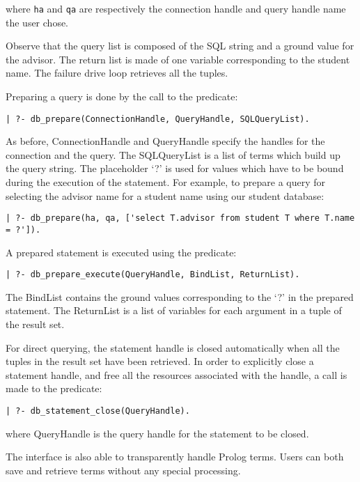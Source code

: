\noindent
where {\tt ha} and {\tt qa} are respectively the connection handle and query
handle name the user chose.

Observe that the query list is composed of the SQL string and a ground value
for the advisor. The return list is made of one variable corresponding to
the student name. The failure drive loop retrieves all the tuples.

Preparing a  query is done by the call to the predicate:

\begin{verbatim}
| ?- db_prepare(ConnectionHandle, QueryHandle, SQLQueryList).
\end{verbatim}

As before, ConnectionHandle and QueryHandle specify the handles for
the connection and the query. The SQLQueryList is a list of terms which
build up the query string. The placeholder `?' is used for values which 
have to be bound during the execution of the statement.
For example, to prepare a query for selecting the advisor name for a student
name using our student database:

\begin{verbatim}
| ?- db_prepare(ha, qa, ['select T.advisor from student T where T.name = ?']).
\end{verbatim}

A prepared statement is executed using the predicate:

\begin{verbatim}
| ?- db_prepare_execute(QueryHandle, BindList, ReturnList).
\end{verbatim}

The BindList contains the ground values corresponding to the `?' in
the prepared statement. The ReturnList is a list of variables for
each argument in a tuple of the result set.

For direct querying, the statement handle is closed automatically when
all the tuples in the result set have been retrieved. In order to explicitly
close a statement handle, and free all the resources associated with
the handle, a call is made to the predicate:

\begin{verbatim}
| ?- db_statement_close(QueryHandle).
\end{verbatim}

\noindent
where QueryHandle is the query handle for the statement to be closed.

The interface is also able to transparently handle Prolog terms. 
Users can both save and retrieve terms without any special processing.


